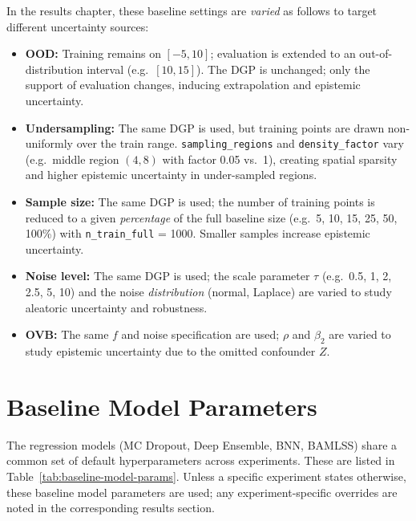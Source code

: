 In the results chapter, these baseline settings are \emph{varied} as follows to target different uncertainty sources:
\begin{itemize}
  \item \textbf{OOD:} Training remains on \([-5, 10]\); evaluation is extended to an out-of-distribution interval (e.g.\ \([10, 15]\)). The DGP is unchanged; only the support of evaluation changes, inducing extrapolation and epistemic uncertainty.
  \item \textbf{Undersampling:} The same DGP is used, but training points are drawn non-uniformly over the train range. \texttt{sampling\_regions} and \texttt{density\_factor} vary (e.g.\ middle region \((4, 8)\) with factor 0.05 vs.\ 1), creating spatial sparsity and higher epistemic uncertainty in under-sampled regions.
  \item \textbf{Sample size:} The same DGP is used; the number of training points is reduced to a given \emph{percentage} of the full baseline size (e.g.\ 5, 10, 15, 25, 50, 100\%) with \texttt{n\_train\_full} = 1000. Smaller samples increase epistemic uncertainty.
  \item \textbf{Noise level:} The same DGP is used; the scale parameter \(\tau\) (e.g.\ 0.5, 1, 2, 2.5, 5, 10) and the noise \emph{distribution} (normal, Laplace) are varied to study aleatoric uncertainty and robustness.
  \item \textbf{OVB:} The same \(f\) and noise specification are used; \(\rho\) and \(\beta_2\) are varied to study epistemic uncertainty due to the omitted confounder \(Z\).
\end{itemize}

\section{Baseline Model Parameters}
\label{sec:baseline-model-params}

The regression models (MC Dropout, Deep Ensemble, BNN, BAMLSS) share a common set of default hyperparameters across experiments. These are listed in Table~\ref{tab:baseline-model-params}. Unless a specific experiment states otherwise, these baseline model parameters are used; any experiment-specific overrides are noted in the corresponding results section.

